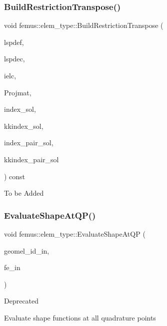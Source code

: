 \subsubsection{\texorpdfstring{Build\+Restriction\+Transpose()}{BuildRestrictionTranspose()}}
{\footnotesize\ttfamily void femus\+::elem\+\_\+type\+::\+Build\+Restriction\+Transpose (\begin{DoxyParamCaption}\item[{const \mbox{\hyperlink{classfemus_1_1_linear_equation}{Linear\+Equation}} \&}]{lspdef,  }\item[{const \mbox{\hyperlink{classfemus_1_1_linear_equation}{Linear\+Equation}} \&}]{lspdec,  }\item[{const int \&}]{ielc,  }\item[{\mbox{\hyperlink{classfemus_1_1_sparse_matrix}{Sparse\+Matrix}} $\ast$}]{Projmat,  }\item[{const unsigned \&}]{index\+\_\+sol,  }\item[{const unsigned \&}]{kkindex\+\_\+sol,  }\item[{const unsigned \&}]{index\+\_\+pair\+\_\+sol,  }\item[{const unsigned \&}]{kkindex\+\_\+pair\+\_\+sol }\end{DoxyParamCaption}) const}

To be Added \mbox{\label{classfemus_1_1elem__type_ab5244df8f1bc5c57a81158787bb1a588}} 
\subsubsection{\texorpdfstring{Evaluate\+Shape\+At\+Q\+P()}{EvaluateShapeAtQP()}}
{\footnotesize\ttfamily void femus\+::elem\+\_\+type\+::\+Evaluate\+Shape\+At\+QP (\begin{DoxyParamCaption}\item[{const std\+::string}]{geomel\+\_\+id\+\_\+in,  }\item[{const std\+::string}]{fe\+\_\+in }\end{DoxyParamCaption})\hspace{0.3cm}{\ttfamily [virtual]}}

\begin{DoxyRefDesc}{Deprecated}
\item[\mbox{\hyperlink{deprecated__deprecated000016}{Deprecated}}]Evaluate shape functions at all quadrature points \end{DoxyRefDesc}
\mbox{\label{classfemus_1_1elem__type_a8d0ba58ed22eccd39304ba1d84a7b891}} 
